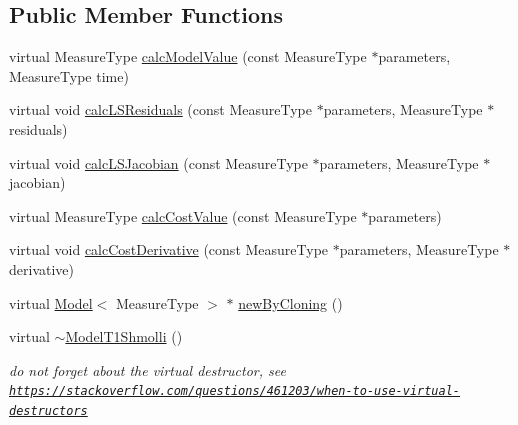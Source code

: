 \subsection*{Public Member Functions}
\begin{DoxyCompactItemize}
\item 
virtual Measure\+Type \hyperlink{class_ox_1_1_model_t1_shmolli_a72576d4db2ff938037c3d9d4fe25b9d7}{calc\+Model\+Value} (const Measure\+Type $\ast$parameters, Measure\+Type time)
\item 
virtual void \hyperlink{class_ox_1_1_model_t1_shmolli_ae393758f44f51e2fddae4c3c919fe4db}{calc\+L\+S\+Residuals} (const Measure\+Type $\ast$parameters, Measure\+Type $\ast$residuals)
\item 
virtual void \hyperlink{class_ox_1_1_model_t1_shmolli_a667e5c9088ba65e0cba506246671e3da}{calc\+L\+S\+Jacobian} (const Measure\+Type $\ast$parameters, Measure\+Type $\ast$jacobian)
\item 
virtual Measure\+Type \hyperlink{class_ox_1_1_model_t1_shmolli_a0f9b89832a6321b5b54abb9e219e803d}{calc\+Cost\+Value} (const Measure\+Type $\ast$parameters)
\item 
virtual void \hyperlink{class_ox_1_1_model_t1_shmolli_afaadbc879361f3ea674fe79a9fc1cf49}{calc\+Cost\+Derivative} (const Measure\+Type $\ast$parameters, Measure\+Type $\ast$derivative)
\item 
virtual \hyperlink{class_ox_1_1_model}{Model}$<$ Measure\+Type $>$ $\ast$ \hyperlink{class_ox_1_1_model_t1_shmolli_a846fb817183738d5c2b3f9f126c1597b}{new\+By\+Cloning} ()
\item 
virtual \hyperlink{class_ox_1_1_model_t1_shmolli_ad5dd9c59e049f1c356541ac278bc1e18}{$\sim$\+Model\+T1\+Shmolli} ()\hypertarget{class_ox_1_1_model_t1_shmolli_ad5dd9c59e049f1c356541ac278bc1e18}{}\label{class_ox_1_1_model_t1_shmolli_ad5dd9c59e049f1c356541ac278bc1e18}

\begin{DoxyCompactList}\small\item\em do not forget about the virtual destructor, see \href{https://stackoverflow.com/questions/461203/when-to-use-virtual-destructors}{\tt https\+://stackoverflow.\+com/questions/461203/when-\/to-\/use-\/virtual-\/destructors} \end{DoxyCompactList}\end{DoxyCompactItemize}
